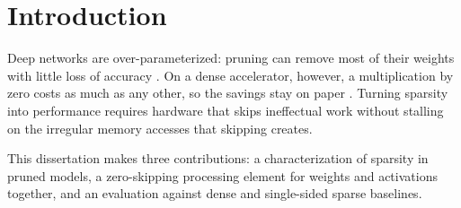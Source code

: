 \chapter{Introduction}
\label{ch:introduction}

Deep networks are over-parameterized: pruning can remove most of their weights with little loss
of accuracy \citep{han2016deepcompression}. On a dense accelerator, however, a multiplication by
zero costs as much as any other, so the savings stay on paper \citep{jouppi2017}. Turning
sparsity into performance requires hardware that skips ineffectual work without stalling on the
irregular memory accesses that skipping creates.

This dissertation makes three contributions: a characterization of sparsity in pruned models,
a zero-skipping processing element for weights and activations together, and an evaluation
against dense and single-sided sparse baselines.
